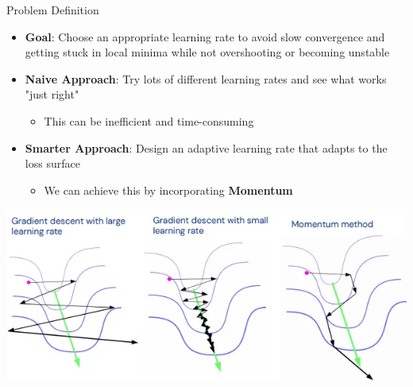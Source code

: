 \documentclass[serif, aspectratio=169]{beamer}
\begin{document}
\begin{frame}{Problem Definition}
    \begin{itemize}
        \item \textbf{Goal}: Choose an appropriate learning rate to avoid slow convergence and getting stuck in local minima while not overshooting or becoming unstable
        \item \textbf{Naive Approach}: Try lots of different learning rates and see what works "just right"
        \begin{itemize}
            \item This can be inefficient and time-consuming
        \end{itemize}
        \item \textbf{Smarter Approach}: Design an adaptive learning rate that adapts to the loss surface
        \begin{itemize}
            \item We can achieve this by incorporating \textbf{Momentum}
        \end{itemize}
    \end{itemize}
    \vfill
    \begin{center}
        \includegraphics[width=0.6\linewidth]{pic/compare_momentum.png}
    \end{center}
\end{frame}
\end{document}

